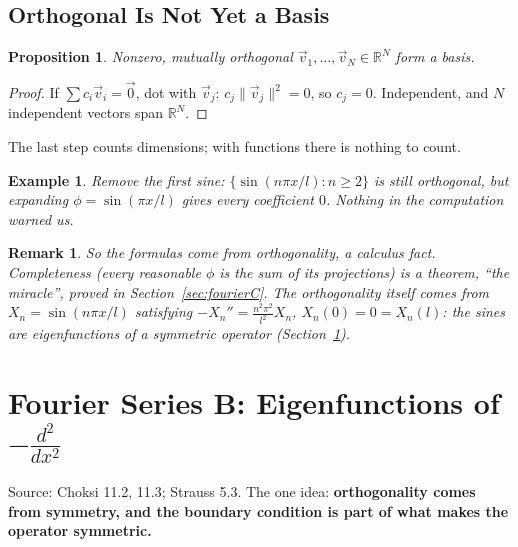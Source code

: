 \documentclass{article}
\newtheorem*{example}{Example}
\newtheorem{remark}{Remark}
\newtheorem{proposition}{Proposition}
\newcommand{\R}{\mathbb{R}}
\begin{document}
\subsection{Orthogonal Is Not Yet a Basis}
\begin{proposition}
    Nonzero, mutually orthogonal $\vec{v}_1, \dots, \vec{v}_N \in \R^N$ form a basis.
\end{proposition}
\begin{proof}
    If $\sum c_i\vec{v}_i = \vec{0}$, dot with $\vec{v}_j$: $c_j\|\vec{v}_j\|^2 = 0$, so $c_j = 0$. Independent, and $N$ independent vectors span $\R^N$.
\end{proof}
The last step counts dimensions; with functions there is nothing to count.
\begin{example}
    Remove the first sine: $\{\sin(n\pi x/l) : n \geq 2\}$ is still orthogonal, but expanding $\phi = \sin(\pi x/l)$ gives every coefficient $0$. Nothing in the computation warned us.
\end{example}
\begin{remark}
    So the formulas come from orthogonality, a calculus fact. \emph{Completeness} (every reasonable $\phi$ is the sum of its projections) is a theorem, ``the miracle'', proved in Section~\ref{sec:fourierC}. The orthogonality itself comes from $X_n = \sin(n\pi x/l)$ satisfying $-X_n'' = \frac{n^2\pi^2}{l^2}X_n$, $X_n(0) = 0 = X_n(l)$: the sines are eigenfunctions of a symmetric operator (Section~\ref{sec:fourierB}).
\end{remark}


\section{Fourier Series B: Eigenfunctions of $-\frac{d^2}{dx^2}$}\label{sec:fourierB}
Source: Choksi 11.2, 11.3; Strauss 5.3. The one idea: \textbf{orthogonality comes from symmetry, and the boundary condition is part of what makes the operator symmetric.}
\end{document}
